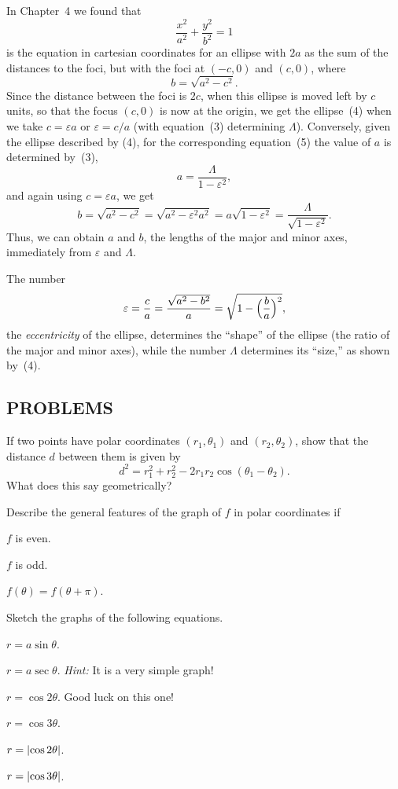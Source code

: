 In Chapter~4 we found that
\begin{equation}
\frac{x^2}{a^2}+\frac{y^2}{b^2}=1\tag{5}
\end{equation}
is the equation in cartesian coordinates for an ellipse with $2a$ as the sum of
the distances to the foci, but with the foci at $(-c,0)$ and $(c,0)$, where
\[
b=\sqrt{a^2-c^2}.
\]
Since the distance between the foci is $2c$, when this ellipse is moved left by
$c$ units, so that the focus $(c,0)$ is now at the origin, we get the
ellipse~(4) when we take $c=\varepsilon a$ or $\varepsilon=c/a$ (with
equation~(3) determining $\Lambda$). Conversely, given the ellipse described by
(4), for the corresponding equation~(5) the value of $a$ is determined by~(3),
\[
a=\frac{\Lambda}{1-\varepsilon^2},
\]
and again using $c=\varepsilon a$, we get
\[
b=\sqrt{a^2-c^2}=\sqrt{a^2-\varepsilon^2a^2}=a\sqrt{1-\varepsilon^2}
=\frac{\Lambda}{\sqrt{1-\varepsilon^2}}.
\]
Thus, we can obtain $a$ and $b$, the lengths of the major and minor axes,
immediately from $\varepsilon$ and $\Lambda$.

The number
\[
\varepsilon=\frac{c}{a}=\frac{\sqrt{a^2-b^2}}{a}=\sqrt{1-\Bigl(\frac{b}{a}\Bigr)^2},
\]
the \emph{eccentricity} of the ellipse, determines the ``shape'' of the ellipse
(the ratio of the major and minor axes), while the number $\Lambda$ determines
its ``size,'' as shown by~(4).

\subsection*{PROBLEMS}

 If two points have polar coordinates $(r_1,\theta_1)$ and
$(r_2,\theta_2)$, show that the distance $d$ between them is given by
\[
d^2=r_1^2+r_2^2-2r_1r_2\cos(\theta_1-\theta_2).
\]
What does this say geometrically?

 Describe the general features of the graph of $f$ in polar
coordinates if
\begin{romans}
\item $f$ is even.
\item $f$ is odd.
\item $f(\theta)=f(\theta+\pi)$.
\end{romans}

 Sketch the graphs of the following equations.
\begin{romans}
\item $r=a\sin\theta$.
\item $r=a\sec\theta$. \textit{Hint:} It is a very simple graph!
\item $r=\cos 2\theta$. Good luck on this one!
\item $r=\cos 3\theta$.
\item $r=\lvert\cos 2\theta\rvert$.
\item $r=\lvert\cos 3\theta\rvert$.
\end{romans}

